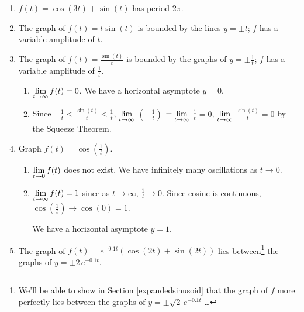 \begin{enumerate}

\setcounter{enumi}{\value{HW}}

\item  $f(t) = \cos(3t) + \sin(t)$ has period $2\pi$.

\item  The graph of  $f(t) = t \sin(t)$ is bounded by the lines  $y = \pm t$;   $f$ has a variable amplitude of $t$.

\item The graph of $f(t) = \frac{\sin(t)}{t}$ is  bounded by the graphs of  $y = \pm \frac{1}{t}$; $f$ has a variable amplitude of $\frac{1}{t}$.

\begin{enumerate}

\item  $\displaystyle{\lim_{t \rightarrow \infty} f(t) = 0}$.    We have a horizontal asymptote $y = 0$.

\item  Since   $-\frac{1}{t} \leq \frac{\sin(t)}{t} \leq \frac{1}{t}$,  $\displaystyle{\lim_{t \rightarrow \infty}}$  $\left(- \frac{1}{t}\right)$ $=\displaystyle{\lim_{t \rightarrow \infty}}$ $\frac{1}{t} = 0$,    $\displaystyle{\lim_{t \rightarrow \infty}}$ $\frac{\sin(t)}{t} = 0$ by the Squeeze Theorem.

\end{enumerate}


\item  Graph $f(t) = \cos\left(\frac{1}{t}\right)$.  

\begin{enumerate}

\item   $\displaystyle{\lim_{t \rightarrow 0} f(t)}$ does not exist.  We have infinitely many oscillations as $t \rightarrow 0$.

\item $\displaystyle{\lim_{t \rightarrow \infty} f(t) = 1}$ since as $t \rightarrow \infty$, $\frac{1}{t} \rightarrow 0$.  Since cosine is continuous, $\cos\left(\frac{1}{t}\right) \rightarrow \cos(0) =  1$.  

\smallskip

We have a horizontal asymptote $y = 1$.

\end{enumerate}

\smallskip

\item  The graph of  $f(t) = e^{-0.1t} \left( \cos(2t) + \sin(2t)\right)$ lies between\footnote{We'll be able to show in Section \ref{expandedsinusoid} that the graph of $f$ more perfectly lies between the graphs of $y = \pm \sqrt{2} \, e^{-0.1 t}$ \ldots}  the graphs of $y = \pm 2 \, e^{-0.1t}$.
\begin{enumerate}


\end{enumerate}
\end{enumerate}
